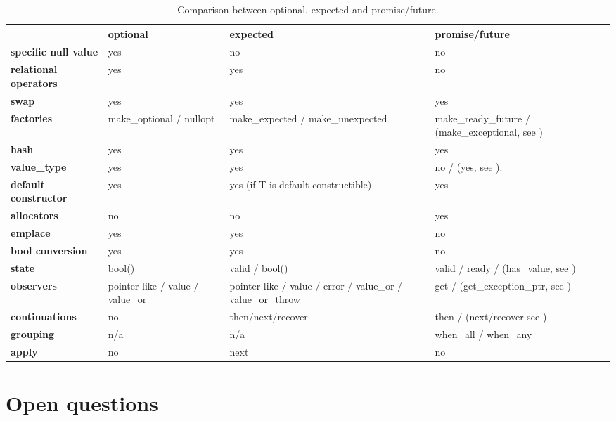 \documentclass[a4paper,10pt]{article}
\begin{document}
\begin{table}
\bgroup
\def\arraystretch{1.5}
\begin{tabular}{|l|>{\raggedright\arraybackslash}p{4cm}|>{\raggedright\arraybackslash}p{4cm}|>{\raggedright\arraybackslash}p{4cm}|}
\hline
                    & \textbf{optional} & \textbf{expected} & \textbf{promise/future} \\
\hline
\textbf{specific null value} & yes & no & no \\
\hline
\textbf{relational operators} & yes & yes & no \\
\hline
\textbf{swap} & yes & yes & yes \\
\hline
\textbf{factories} & make_optional / nullopt & make_expected / make_unexpected & make_ready_future / (make_exceptional, see \cite{MoreAsync}) \\
\hline
\textbf{hash} & yes & yes & yes \\
\hline
\textbf{value_type} & yes & yes & no / (yes, see \cite{MoreAsync}).  \\
\hline
\textbf{default constructor} & yes & yes (if T is default constructible) & yes \\
\hline
\textbf{allocators} & no & no & yes \\
\hline
\textbf{emplace} & yes & yes & no \\
\hline
\textbf{bool conversion} & yes & yes & no \\
\hline
\textbf{state} & bool()  & valid / bool() & valid / ready / (has_value, see \cite{MoreAsync}) \\
\hline
\textbf{observers} & pointer-like / value / value_or & pointer-like / value / error / value_or / value_or_throw & get / (get_exception_ptr, see \cite{MoreAsync}) \\
\hline
\textbf{continuations} & no & then/next/recover  & then / (next/recover see \cite{MoreAsync}) \\
\hline
\textbf{grouping} & n/a & n/a & when_all / when_any \\
\hline
\textbf{apply} & no & next & no \\
\hline
\end{tabular}
\egroup
\caption{Comparison between optional, expected and promise/future.}
\label{comp-monads}
\end{table}

\section{Open questions}
\end{document}
